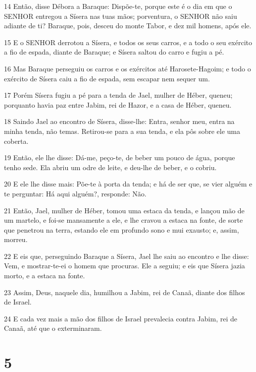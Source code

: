 \par 14 Então, disse Débora a Baraque: Dispõe-te, porque este é o dia em que o SENHOR entregou a Sísera nas tuas mãos; porventura, o SENHOR não saiu adiante de ti? Baraque, pois, desceu do monte Tabor, e dez mil homens, após ele.
\par 15 E o SENHOR derrotou a Sísera, e todos os seus carros, e a todo o seu exército a fio de espada, diante de Baraque; e Sísera saltou do carro e fugiu a pé.
\par 16 Mas Baraque perseguiu os carros e os exércitos até Harosete-Hagoim; e todo o exército de Sísera caiu a fio de espada, sem escapar nem sequer um.
\par 17 Porém Sísera fugiu a pé para a tenda de Jael, mulher de Héber, queneu; porquanto havia paz entre Jabim, rei de Hazor, e a casa de Héber, queneu.
\par 18 Saindo Jael ao encontro de Sísera, disse-lhe: Entra, senhor meu, entra na minha tenda, não temas. Retirou-se para a sua tenda, e ela pôs sobre ele uma coberta.
\par 19 Então, ele lhe disse: Dá-me, peço-te, de beber um pouco de água, porque tenho sede. Ela abriu um odre de leite, e deu-lhe de beber, e o cobriu.
\par 20 E ele lhe disse mais: Põe-te à porta da tenda; e há de ser que, se vier alguém e te perguntar: Há aqui alguém?, responde: Não.
\par 21 Então, Jael, mulher de Héber, tomou uma estaca da tenda, e lançou mão de um martelo, e foi-se mansamente a ele, e lhe cravou a estaca na fonte, de sorte que penetrou na terra, estando ele em profundo sono e mui exausto; e, assim, morreu.
\par 22 E eis que, perseguindo Baraque a Sísera, Jael lhe saiu ao encontro e lhe disse: Vem, e mostrar-te-ei o homem que procuras. Ele a seguiu; e eis que Sísera jazia morto, e a estaca na fonte.
\par 23 Assim, Deus, naquele dia, humilhou a Jabim, rei de Canaã, diante dos filhos de Israel.
\par 24 E cada vez mais a mão dos filhos de Israel prevalecia contra Jabim, rei de Canaã, até que o exterminaram.

\chapter{5}

